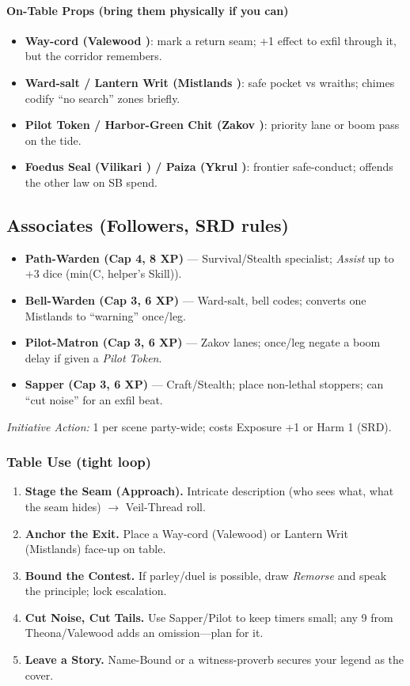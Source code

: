 \paragraph{On-Table Props (bring them physically if you can)}
\begin{itemize}
  \item \textbf{Way-cord (Valewood \SuitDiamond{})}: mark a return seam; +1 effect to exfil through it, but the corridor remembers.
  \item \textbf{Ward-salt / Lantern Writ (Mistlands \SuitDiamond{})}: safe pocket vs wraiths; chimes codify ``no search'' zones briefly.
  \item \textbf{Pilot Token / Harbor-Green Chit (Zakov \SuitDiamond{})}: priority lane or boom pass on the tide.
  \item \textbf{Foedus Seal (Vilikari \SuitDiamond{}) / Paiza (Ykrul \SuitDiamond{})}: frontier safe-conduct; offends the other law on SB spend.
\end{itemize}

\subsection{Associates (Followers, SRD rules)}
\begin{itemize}
  \item \textbf{Path-Warden (Cap 4, 8 XP)} --- Survival/Stealth specialist; \emph{Assist} up to +3 dice (min(C, helper's Skill)).
  \item \textbf{Bell-Warden (Cap 3, 6 XP)} --- Ward-salt, bell codes; converts one Mistlands \SuitClub{} to ``warning'' once/leg.
  \item \textbf{Pilot-Matron (Cap 3, 6 XP)} --- Zakov lanes; once/leg negate a boom delay if given a \emph{Pilot Token}.
  \item \textbf{Sapper (Cap 3, 6 XP)} --- Craft/Stealth; place non-lethal stoppers; can ``cut noise'' for an exfil beat.
\end{itemize}
\emph{Initiative Action:} 1 per scene party-wide; costs Exposure +1 or Harm 1 (SRD).

\subsubsection{Table Use (tight loop)}
\begin{enumerate}
  \item \textbf{Stage the Seam (Approach).} Intricate description (who sees what, what the seam hides) $\rightarrow$ Veil-Thread roll.
  \item \textbf{Anchor the Exit.} Place a Way-cord (Valewood) or Lantern Writ (Mistlands) \SuitDiamond{} face-up on table.
  \item \textbf{Bound the Contest.} If parley/duel is possible, draw \emph{Remorse} and speak the principle; lock escalation.
  \item \textbf{Cut Noise, Cut Tails.} Use Sapper/Pilot to keep timers small; any 9 from Theona/Valewood adds an omission---plan for it.
  \item \textbf{Leave a Story.} Name-Bound or a witness-proverb secures your legend as the cover.
\end{enumerate}

